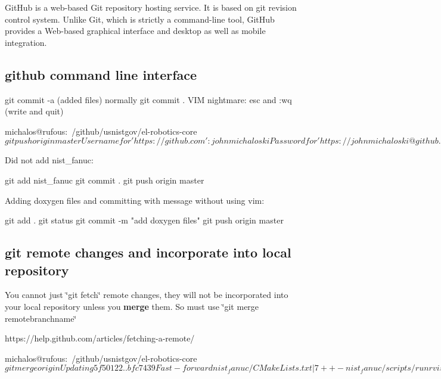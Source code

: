 Git\-Hub is a web-\/based Git repository hosting service. It is based on git revision control system. Unlike Git, which is strictly a command-\/line tool, Git\-Hub provides a Web-\/based graphical interface and desktop as well as mobile integration.

\subsection*{github command line interface }

git commit -\/a (added files) normally git commit . V\-I\-M nightmare\-: esc and \-:wq (write and quit)

\begin{DoxyVerb}michalos@rufous:~/github/usnistgov/el-robotics-core$ git push origin master
Username for 'https://github.com': johnmichaloski
Password for 'https://johnmichaloski@github.com': 
Counting objects: 10, done.
Delta compression using up to 8 threads.
Compressing objects: 100%
Writing objects: 100%
Total 2 (delta 1), reused 0 (delta 0)
To https://github.com/usnistgov/el-robotics-core
   395d561..b74a274  master -> master
michalos@rufous:~/github/usnistgov/el-robotics-core$ 
\end{DoxyVerb}


Did not add nist\-\_\-fanuc\-: \begin{DoxyVerb}git add nist_fanuc
git commit .
git push origin master
\end{DoxyVerb}


Adding doxygen files and committing with message without using vim\-: \begin{DoxyVerb}git add .
git status
git commit -m "add doxygen files"
git push origin master
\end{DoxyVerb}


\subsection*{git remote changes and incorporate into local repository }

You cannot just \char`\"{}git fetch\char`\"{} remote changes, they will not be incorporated into your local repository unless you {\bfseries merge} them. So must use \char`\"{}git merge remotebranchname\char`\"{} \begin{DoxyVerb}https://help.github.com/articles/fetching-a-remote/

michalos@rufous:~/github/usnistgov/el-robotics-core$ git merge origin
Updating 5f50122..bfc7439
Fast-forward
 nist_fanuc/CMakeLists.txt           |   7 ++-
 nist_fanuc/scripts/runrvizdemo.bash |   2 +-
 nist_kitting/src/move_group.cpp     |  59 +------------------
 nist_kitting/src/mover.cpp          | 111 ++++--------------------------------
 ulapi/package.xml                   |   2 +-
 5 files changed, 20 insertions(+), 161 deletions(-)
michalos@rufous:~/github/usnistgov/el-robotics-core$ 
\end{DoxyVerb}



